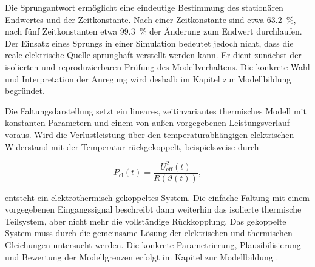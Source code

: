Die Sprungantwort ermöglicht eine eindeutige Bestimmung des stationären
Endwertes und der Zeitkonstante. Nach einer Zeitkonstante sind etwa
\SI{63.2}{\percent}, nach fünf Zeitkonstanten etwa
\SI{99.3}{\percent} der Änderung zum Endwert durchlaufen. Der Einsatz eines
Sprungs in einer Simulation bedeutet jedoch nicht, dass die reale elektrische
Quelle sprunghaft verstellt werden kann. Er dient zunächst der isolierten und
reproduzierbaren Prüfung des Modellverhaltens. Die konkrete Wahl und
Interpretation der Anregung wird deshalb im Kapitel zur Modellbildung
begründet.

Die Faltungsdarstellung setzt ein lineares, zeitinvariantes thermisches Modell
mit konstanten Parametern und einem von außen vorgegebenen Leistungsverlauf
voraus. Wird die Verlustleistung über den temperaturabhängigen elektrischen
Widerstand mit der Temperatur rückgekoppelt, beispielsweise durch

\begin{equation}
  P_{\mathrm{el}}(t)
  =
  \frac{U_{\mathrm{eff}}^2(t)}{R(\vartheta(t))},
  \label{eq:elektrothermische_rueckkopplung}
\end{equation}

entsteht ein elektrothermisch gekoppeltes System. Die einfache Faltung mit
einem vorgegebenen Eingangssignal beschreibt dann weiterhin das isolierte
thermische Teilsystem, aber nicht mehr die vollständige Rückkopplung. Das
gekoppelte System muss durch die gemeinsame Lösung der elektrischen und
thermischen Gleichungen untersucht werden. Die konkrete Parametrierung,
Plausibilisierung und Bewertung der Modellgrenzen erfolgt im Kapitel zur
Modellbildung
\autocite{Griesinger_Waermemanagement}.

